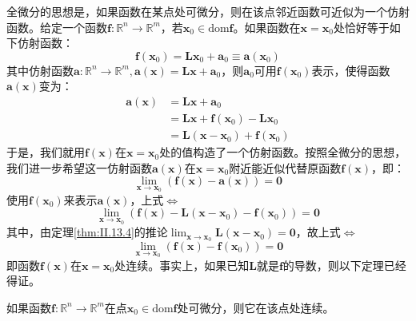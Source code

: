 \documentclass[main.tex]{subfiles}
\begin{document}
全微分的思想是，如果函数在某点处可微分，则在该点邻近函数可近似为一个仿射函数。给定一个函数$\mathbf{f}:\mathbb{R}^n\rightarrow\mathbb{R}^m$，若$\mathbf{x}_0\in\mathrm{dom}\mathbf{f}$。如果函数在$\mathbf{x}=\mathbf{x}_0$处恰好等于如下仿射函数：
\[
\mathbf{f}\left(\mathbf{x}_0\right)=\mathbf{Lx}_0+\mathbf{a}_0\equiv\mathbf{a}\left(\mathbf{x}_0\right)
\]
其中仿射函数$\mathbf{a}:\mathbb{R}^n\rightarrow\mathbb{R}^m,\mathbf{a}\left(\mathbf{x}\right)=\mathbf{Lx}+\mathbf{a}_0$，则$\mathbf{a}_0$可用$\mathbf{f}\left(\mathbf{x}_0\right)$表示，使得函数$\mathbf{a}\left(\mathbf{x}\right)$变为：
\begin{align*}
\mathbf{a}\left(\mathbf{x}\right)&=\mathbf{Lx}+\mathbf{a}_0\\
&=\mathbf{Lx}+\mathbf{f}\left(\mathbf{x}_0\right)-\mathbf{Lx}_0\\
&=\mathbf{L}\left(\mathbf{x}-\mathbf{x}_0\right)+\mathbf{f}\left(\mathbf{x}_0\right)
\end{align*}
于是，我们就用$\mathbf{f}\left(\mathbf{x}\right)$在$\mathbf{x}=\mathbf{x}_0$处的值构造了一个仿射函数。按照全微分的思想，我们进一步希望这一仿射函数$\mathbf{a}\left(\mathbf{x}\right)$在$\mathbf{x}=\mathbf{x}_0$附近能近似代替原函数$\mathbf{f}\left(\mathbf{x}\right)$，即：
\[\lim_{\mathbf{x}\to\mathbf{x}_0}\left(\mathbf{f}\left(\mathbf{x}\right)-\mathbf{a}\left(\mathbf{x}\right)\right)=\mathbf{0}\]
使用$\mathbf{f}\left(\mathbf{x}_0\right)$来表示$\mathbf{a}\left(\mathbf{x}\right)$，上式$\Leftrightarrow$
\[\lim_{\mathbf{x}\to\mathbf{x}_0}\left(\mathbf{f}\left(\mathbf{x}\right)-\mathbf{L}\left(\mathbf{x}-\mathbf{x}_0\right)-\mathbf{f}\left(\mathbf{x}_0\right)\right)=\mathbf{0}
\]
其中，由定理\ref{thm:II.13.4}的推论$\lim_{\mathbf{x}\to\mathbf{x}_0}\mathbf{L}\left(\mathbf{x}-\mathbf{x}_0\right)=\mathbf{0}$，故上式$\Leftrightarrow$
\[
\lim_{\mathbf{x}\to\mathbf{x}_0}\left(\mathbf{f}\left(\mathbf{x}\right)-\mathbf{f}\left(\mathbf{x}_0\right)\right)=\mathbf{0}
\]
即函数$\mathbf{f}\left(\mathbf{x}\right)$在$\mathbf{x}=\mathbf{x}_0$处连续。事实上，如果已知$\mathbf{L}$就是$\mathbf{f}$的导数，则以下定理已经得证。

\begin{theorem}
如果函数$\mathbf{f}:\mathbb{R}^n\rightarrow\mathbb{R}^m$在点$\mathbf{x}_0\in\mathrm{dom}\mathbf{f}$处可微分，则它在该点处连续。
\end{theorem}
\end{document}
